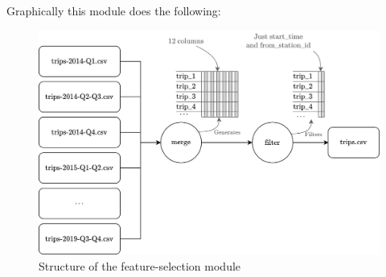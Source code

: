Graphically this module does the following:
\begin{figure}[H]
    \centering
    \includegraphics[width=12cm]{images/solution/modules/feature-selection.png}
    \caption{Structure of the feature-selection module}
\end{figure}